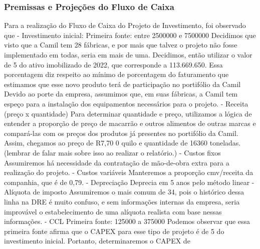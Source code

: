 \documentclass[11pt]{article}
\begin{document}
\subsubsection{\textbf{Premissas e Projeções do Fluxo de Caixa }}
Para a realização do Fluxo de Caixa do Projeto de Investimento, foi observado que 
- Investimento inicial:
Primeira fonte: entre 2500000 e 7500000
Decidimos que visto que a Camil tem 28 fábricas, e por mais que talvez o projeto não fosse implementado em todas, seria em mais de uma. Decidimos, então utilizar o valor de 5 do ativo imobilizado de 2022, que corresponde a 113.669.650. Essa porcentagem diz respeito ao mínimo de porcentagem do faturamento que estimamos que esse novo produto terá de participação no portifólio da Camil
Devido ao porte da empresa, assumimos que, em suas fábricas, a Camil tem espeço para a instalação dos equipamentos necessários para o projeto.
- Receita (preço x quantidade)
Para determinar quantidade e preço, utilizamos a lógica de entender a proporção de preço de macarrão e outros alimentos de outras marcas e compará-las com os preços dos produtos já presentes no portifólio da Camil. Assim, chegamos ao preço de R7,70 0 quilo e quantidade de 16360 toneladas. (lembrar de falar mais sobre isso ao realizar o relatório.) 
- Custos fixos 
Assumiremos há necessidade da contratação de mão-de-obra extra para a realização do projeto.
- Custos variáveis
Manteremos a proporção cmv/receita da companhia, que é de 0,79.
- Depreciação 
Deprecia em 5 anos pelo método linear
- Alíquota de imposto
Assumiremos o mais comum de 34, pois o histórico dessa linha na DRE é muito confuso, e sem informações internas da empresa, seria improvável o estabelecimento de uma alíquota realista com base nessas informações.
- CCL
Primeira fonte: 125000 a 375000
Podemos observar que essa primeira fonte afirma que o CAPEX para esse tipo de projeto é de 5 do investimento inicial. Portanto, determinaremos o CAPEX de 
\end{document}
